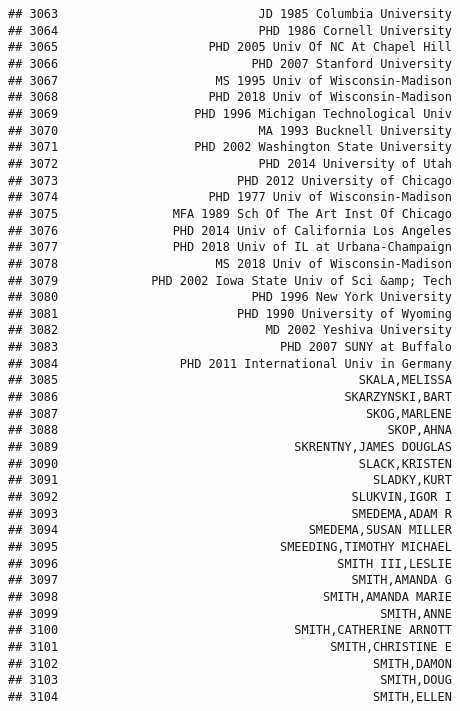 \documentclass[
]{article}
\begin{document}
\begin{verbatim}
## 3063                            JD 1985 Columbia University
## 3064                            PHD 1986 Cornell University
## 3065                     PHD 2005 Univ Of NC At Chapel Hill
## 3066                           PHD 2007 Stanford University
## 3067                      MS 1995 Univ of Wisconsin-Madison
## 3068                     PHD 2018 Univ of Wisconsin-Madison
## 3069                   PHD 1996 Michigan Technological Univ
## 3070                            MA 1993 Bucknell University
## 3071                   PHD 2002 Washington State University
## 3072                            PHD 2014 University of Utah
## 3073                         PHD 2012 University of Chicago
## 3074                     PHD 1977 Univ of Wisconsin-Madison
## 3075                MFA 1989 Sch Of The Art Inst Of Chicago
## 3076                PHD 2014 Univ of California Los Angeles
## 3077                PHD 2018 Univ of IL at Urbana-Champaign
## 3078                      MS 2018 Univ of Wisconsin-Madison
## 3079             PHD 2002 Iowa State Univ of Sci &amp; Tech
## 3080                           PHD 1996 New York University
## 3081                         PHD 1990 University of Wyoming
## 3082                             MD 2002 Yeshiva University
## 3083                               PHD 2007 SUNY at Buffalo
## 3084                 PHD 2011 International Univ in Germany
## 3085                                          SKALA,MELISSA
## 3086                                        SKARZYNSKI,BART
## 3087                                           SKOG,MARLENE
## 3088                                              SKOP,AHNA
## 3089                                 SKRENTNY,JAMES DOUGLAS
## 3090                                          SLACK,KRISTEN
## 3091                                            SLADKY,KURT
## 3092                                         SLUKVIN,IGOR I
## 3093                                         SMEDEMA,ADAM R
## 3094                                   SMEDEMA,SUSAN MILLER
## 3095                               SMEEDING,TIMOTHY MICHAEL
## 3096                                       SMITH III,LESLIE
## 3097                                         SMITH,AMANDA G
## 3098                                     SMITH,AMANDA MARIE
## 3099                                             SMITH,ANNE
## 3100                                 SMITH,CATHERINE ARNOTT
## 3101                                      SMITH,CHRISTINE E
## 3102                                            SMITH,DAMON
## 3103                                             SMITH,DOUG
## 3104                                            SMITH,ELLEN

\end{verbatim}
\end{document}
